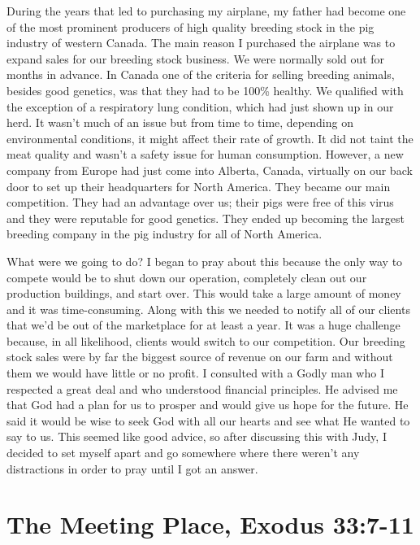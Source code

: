 \documentclass[twoside, 12pt]{book}
\begin{document}
During the years that led to purchasing my airplane, my father had become one of the most prominent producers of high quality breeding stock in the pig industry of western Canada. The main reason I purchased the airplane was to expand sales for our breeding stock business. We were normally sold out for months in advance. In Canada one of the criteria for selling breeding animals, besides good genetics, was that they had to be 100\% healthy. We qualified with the exception of a respiratory lung condition, which had just shown up in our herd. It wasn't much of an issue but from time to time, depending on environmental conditions, it might affect their rate of growth. It did not taint the meat quality and wasn't a safety issue for human consumption. However, a new company from Europe had just come into Alberta, Canada, virtually on our back door to set up their headquarters for North America. They became our main competition. They had an advantage over us; their pigs were free of this virus and they were reputable for good genetics. They ended up becoming the largest breeding company in the pig industry for all of North America. 

What were we going to do? I began to pray about this because the only way to compete would be to shut down our operation, completely clean out our production buildings, and start over. This would take a large amount of money and it was time-consuming. Along with this we needed to notify all of our clients that we'd be out of the marketplace for at least a year. It was a huge challenge because, in all likelihood, clients would switch to our competition. Our breeding stock sales were by far the biggest source of revenue on our farm and without them we would have little or no profit. I consulted with a Godly man who I respected a great deal and who understood financial principles. He advised me that God had a plan for us to prosper and would give us hope for the future. He said it would be wise to seek God with all our hearts and see what He wanted to say to us. This seemed like good advice, so after discussing this with Judy, I decided to set myself apart and go somewhere where there weren’t any distractions in order to pray until I got an answer.



\section{The Meeting Place, Exodus 33:7-11}
\
\end{document}
